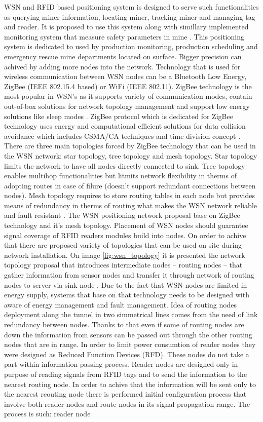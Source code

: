 \documentclass[../main.tex]{subfiles}
\begin{document}
WSN and RFID based positioning system is designed to serve such functionalities as querying miner information, locating miner, tracking miner and managing tag and reader. It is proposed to use this system along with simillary implemented monitoring system that measure safety parameters in mine \cite{WSN_monitoring}. This positioning system is dedicated to used by production monitoring, production scheduling and emergency rescue mine departments located on surface. Bigger precision can achived by adding more nodes into the network. Technology that is used for wireless communication between WSN nodes can be a Bluetooth Low Energy, ZigBee (IEEE 802.15.4 based) or WiFi (IEEE 802.11). ZigBee technology is the most popular in WSN's as it supports variety of communication modes, contain out-of-box solutions for network topology management and support low energy solutions like sleep modes \cite{ZigBee_applications}. ZigBee protocol which is dedicated for ZigBee technology uses energy and computational efficient solutions for data collision avoidance which includes CSMA/CA techniques and time division concept \cite{WSN_monitoring, ZigBee_desc}. There are three main topologies forced by ZigBee technology that can be used in the WSN network: star topology, tree topology and mesh topology. Star topology limits the network to have all nodes directly connected to sink. Tree topology enables multihop functionalities but litmits network flexibility in therms of adopting routes in case of filure (doesn't support redundant connections between nodes). Mesh topology requires to store routing tables in each node but provides means of redundancy in therms of routing what makes the WSN network reliable and fault resistant \cite{ZigBee_desc}. The WSN positioning network proposal base on ZigBee technology and it's mesh topology. Placement of WSN nodes should guarantee signal coverage of RFID readers modules build into nodes. On order to achive that there are proposed variety of topologies that can be used on site during network installation. On image \ref{fig:wsn_topology} it is presented the network topology proposal that introduces intermediate nodes -- routing nodes -- that gather information from sensor nodes and transfer it through network of routing nodes to server via sink node \cite{WSN_monitoring}.  Due to the fact that WSN nodes are limited in energy supply, systems that base on that technology needs to be designed with aware of energy management and fault management. Idea of routing nodes deployment along the tunnel in two simmetrical lines comes from the need of link redundancy between nodes. Thanks to that even if some of routing nodes are down the information from sensors can be passed out through the other routing nodes that are in range. In order to limit power consumtion of reader nodes they were designed as Reduced Function Devices (RFD). These nodes do not take a part within information passing process. Reader nodes are designed only in purpose of reading signals from RFID tags and to send the information to the nearest routing node. In order to achive that the information will be sent only to the nearest reouting node there is performed initial configuration process that involve both reader nodes and route nodes in its signal propagation range. The process is such: reader node 
\end{document}
